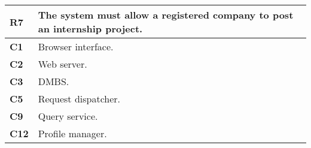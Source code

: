 \begin{table}[H]
    \centering
    \begin{tabular}{|l|m{10cm}|}
        \hline \textbf{R7} & The system must allow a registered company to post an internship project.\\
        \hline \textbf{C1} & Browser interface. \\
        \hline \textbf{C2} & Web server. \\
        \hline \textbf{C3} & DMBS. \\
        \hline \textbf{C5} & Request dispatcher. \\
        \hline \textbf{C9} & Query service. \\
        \hline \textbf{C12} & Profile manager.\\
        \hline
    \end{tabular}
\end{table}

